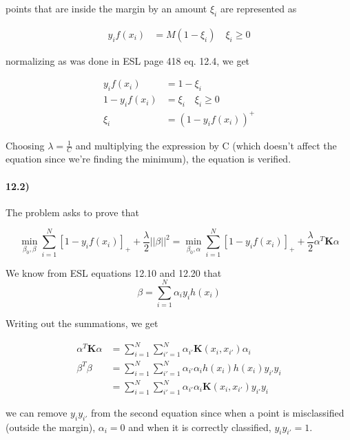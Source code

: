 \documentclass{article}
\begin{document}
points that are inside the margin by an amount $\xi_i$ are represented as 

\begin{align*}
y_i f(x_i) & = M(1- \xi_i) \quad \xi_i \geq 0
\end{align*}

normalizing as was done in ESL page 418 eq. 12.4, we get

\begin{align*}
y_i f(x_i) & = 1- \xi_i
\\
1-y_if(x_i) & = \xi_i \quad \xi_i \geq 0
\\
\xi_i & = (1 - y_if(x_i))^+
\end{align*}

Choosing $\lambda = \frac{1}{C}$ and multiplying the expression by C (which doesn't affect the equation since we're finding the minimum), the equation is verified.

\paragraph{12.2)}

The problem asks to prove that 

\begin{equation*}
\operatorname*{min}_{\beta_0,\beta}\sum_{i=1}^N[1-y_if(x_i)]_+ + \frac{\lambda}{2}||\beta||^2 = \operatorname*{min}_{\beta_0,\alpha}\sum_{i=1}^N[1-y_if(x_i)]_+ + \frac{\lambda}{2}\alpha^T\mathbf{K}\alpha
\end{equation*}

We know from ESL equations 12.10 and 12.20 that 
\begin{equation*}
\beta = \sum_{i=1}^N\alpha_iy_ih(x_i)
\end{equation*}

Writing out the summations, we get

\begin{align*}
\alpha^T\mathbf{K}\alpha & = \sum_{i=1}^N\sum_{i'=1}^N\alpha_{i'}\mathbf{K}(x_i, x_{i'})\alpha_i
\\
\beta^T\beta & = \sum_{i=1}^N\sum_{i'=1}^N\alpha_{i'}\alpha_ih(x_i)h(x_i)y_{i'}y_i
\\
& =  \sum_{i=1}^N\sum_{i'=1}^N\alpha_{i'}\alpha_i\mathbf{K}(x_i, x_{i'})y_{i'}y_i
\end{align*}

we can remove $y_iy_{i'}$ from the second equation since when a point is misclassified (outside the margin), $\alpha_i = 0$ and when it is correctly classified, $y_iy_{i'} = 1$.
\end{document}
